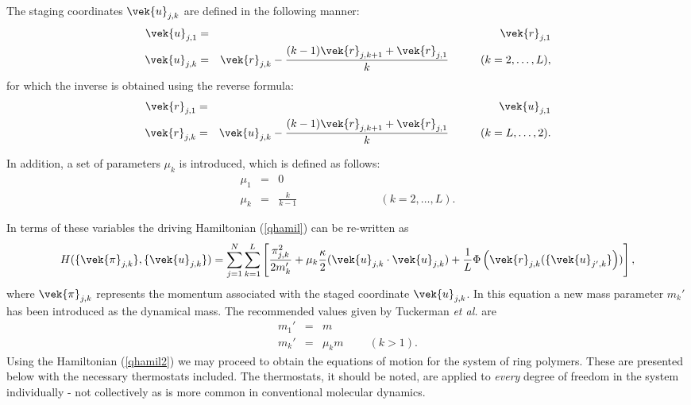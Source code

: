 The staging coordinates $\vek{u}_{j,k}$  are defined in the following manner:
\begin{eqnarray}
  \vek{u}_{j,1}&=&\vek{r}_{j,1}  \nonumber \\
  \vek{u}_{j,k}&=&\vek{r}_{j,k}-\frac{(k-1)\vek{r}_{j,k+1}+\vek{r}_{j,1}}{k}\phantom{xxxxx} (k=2,\ldots,L),
\end{eqnarray}
for which the inverse is obtained using the reverse formula:
\begin{eqnarray}
  \vek{r}_{j,1}&=&\vek{u}_{j,1}  \nonumber \\
  \vek{r}_{j,k}&=&\vek{u}_{j,k}-\frac{(k-1)\vek{r}_{j,k+1}+\vek{r}_{j,1}}{k}\phantom{xxxxx} (k=L,\ldots,2).
\end{eqnarray}

In addition, a set of parameters $\mu_{k}$ is introduced, which is defined as follows:
\begin{eqnarray}
  \mu_{1}&=&0 \nonumber \\
  \mu_{k}&=&\frac{k}{k-1}\phantom{xxxxxxxxxxxxx} (k=2,\ldots,L).
\end{eqnarray}

In terms of these variables the driving Hamiltonian (\ref{qhamil}) can be re-written as
\begin{equation}
  H(\{\vek{\pi}_{j,k}\},\{\vek{u}_{j,k}\})=\sum_{j=1}^{N} \sum_{k=1}^{L}
  \left [ \frac{\pi^{2}_{j,k}}{2m_{k}'}+\mu_{k}\frac{\kappa}{2}(\vek{u}_{j,k}
    \cdot\vek{u}_{j,k} )+ \frac{1}{L} \Phi \left (\vek{r}_{j,k}(\{\vek{u}_{j',k}\} \right )) \right ],
  \label{qhamil2}
\end{equation}
where $\vek{\pi}_{j,k}$ represents the momentum associated with the
staged coordinate $\vek{u}_{j,k}$.  In this equation a new mass
parameter $m_{k}'$ has been introduced as the dynamical mass. The
recommended values given by Tuckerman {\em et al.} \cite{tuckerman-93a}
are
\begin{eqnarray}
  m_{1}'&=&m \nonumber \\
  m_{k}'&=& \mu_{k} m \phantom{xxxx}(k>1).
\end{eqnarray}
Using the Hamiltonian (\ref{qhamil2}) we may proceed to obtain the
equations of motion for the system of ring polymers. These are
presented below with the necessary thermostats included. The
thermostats, it should be noted, are applied to {\em every} degree of
freedom in the system individually - not collectively as is more
common in conventional molecular dynamics.


